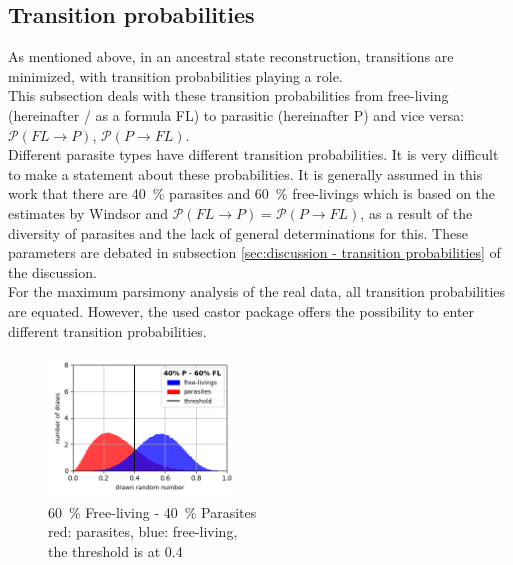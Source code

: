     \subsection{Transition probabilities}
      As mentioned above, in an ancestral state reconstruction, transitions are minimized, with 
        transition probabilities playing a role. \\
      This subsection deals with these transition probabilities from free-living (hereinafter / as a 
        formula FL) to parasitic (hereinafter P) and vice versa: $\mathcal{P}(FL \rightarrow P)$, 
        $\mathcal{P}(P \rightarrow FL)$. \\
      Different parasite types have different transition probabilities. It is very difficult to make a 
        statement about these probabilities. It is generally assumed in this work that there are 40~\% 
        parasites and 60~\% free-livings which is based on the estimates by Windsor \cite{Windsor1998} 
        and $\mathcal{P}(FL \rightarrow P) = \mathcal{P}(P \rightarrow FL)$, as a result of the 
        diversity of parasites and the lack of general determinations for this. These parameters are 
        debated in subsection \ref{sec:discussion - transition probabilities} of the discussion. \\

      For the maximum parsimony analysis of the real data, all transition probabilities are equated.
        However, the used castor package \cite{Louca2017} offers the possibility to enter different 
        transition probabilities.
      \begin{figure}
        \begin{center}
          \includegraphics[trim = 0mm 0mm 0mm 0mm, clip, width=0.45\textwidth]{Figures/40-60.png}
        \end{center}
        \caption{60~\% Free-living - 40~\% Parasites \\ red: parasites, blue: free-living, \\ the threshold is at 0.4}
        \label{fig:Beta distribution}
      \end{figure}

